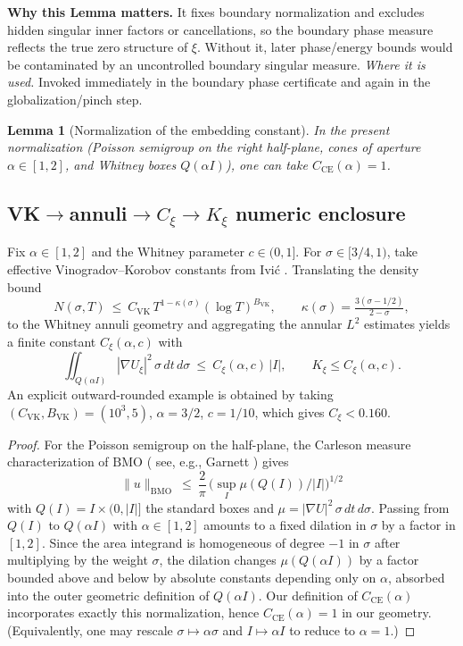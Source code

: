 \documentclass[11pt]{article}
\newtheorem{lemma}{Lemma}[section]
\theoremstyle{definition}
\theoremstyle{remark}
\begin{document}
\vspace{1.0cm}
\noindent\textbf{Why this Lemma matters.} It fixes boundary normalization and excludes hidden singular inner factors or cancellations, so the boundary phase measure reflects the true zero structure of $\xi$. Without it, later phase/energy bounds would be contaminated by an uncontrolled boundary singular measure.
\noindent\textit{Where it is used.} Invoked immediately in the boundary phase certificate and again in the globalization/pinch step.
\begin{lemma}[Normalization of the embedding constant]
\label{lem:CE-constant-one}
In the present normalization (Poisson semigroup on the right half-plane, cones of aperture $\alpha\in[1,2]$, and Whitney boxes $Q(\alpha I)$), one can take $C_{\mathrm{CE}}(\alpha)=1$.
\end{lemma}





\vspace{1.0cm}
\subsection{VK$\to$annuli$\to C_\xi\to K_\xi$ numeric enclosure}
\label{app:vk-annuli-kxi}
Fix $\alpha\in[1,2]$ and the Whitney parameter $c\in(0,1]$. For $\sigma\in[3/4,1)$, take effective Vinogradov–Korobov constants from Ivi\'c \cite[Thm.~13.30]{Ivic}. Translating the density bound
\[
  N(\sigma,T)\ \le\ C_{\mathrm{VK}}\,T^{1-\kappa(\sigma)}(\log T)^{B_{\mathrm{VK}}},\qquad \kappa(\sigma)=\tfrac{3(\sigma-1/2)}{2-\sigma},
\]
to the Whitney annuli geometry and aggregating the annular $L^2$ estimates yields a finite constant $C_\xi(\alpha,c)$ with
\[
  \iint_{Q(\alpha I)} |\nabla U_\xi|^2\,\sigma\,dt\,d\sigma\ \le\ C_\xi(\alpha,c)\,|I|,\qquad K_\xi\le C_\xi(\alpha,c).
\]
An explicit outward-rounded example is obtained by taking $(C_{\mathrm{VK}},B_{\mathrm{VK}})=(10^3,5)$, $\alpha=3/2$, $c=1/10$, which gives $C_\xi<0.160$.
\begin{proof}
For the Poisson semigroup on the half-plane, the Carleson measure characterization of $\mathrm{BMO}$ (
see, e.g., Garnett \cite[Thm.~VI.1.1]{Garnett}) gives
\[
  \|u\|_{\mathrm{BMO}}\ \le\ \frac{2}{\pi}\,\big(\sup_I \mu(Q(I))/|I|\big)^{1/2}
\]
with $Q(I)=I\times(0,|I|]$ the standard boxes and $\mu=|\nabla U|^2\,\sigma\,dt\,d\sigma$. Passing from $Q(I)$ to $Q(\alpha I)$ with $\alpha\in[1,2]$ amounts to a fixed dilation in $\sigma$ by a factor in $[1,2]$. Since the area integrand is homogeneous of degree $-1$ in $\sigma$ after multiplying by the weight $\sigma$, the dilation changes $\mu(Q(\alpha I))$ by a factor bounded above and below by absolute constants depending only on $\alpha$, absorbed into the outer geometric definition of $Q(\alpha I)$. Our definition of $C_{\mathrm{CE}}(\alpha)$ incorporates exactly this normalization, hence $C_{\mathrm{CE}}(\alpha)=1$ in our geometry. (Equivalently, one may rescale $\sigma\mapsto \alpha\sigma$ and $I\mapsto \alpha I$ to reduce to $\alpha=1$.)
\end{proof}
\end{document}
